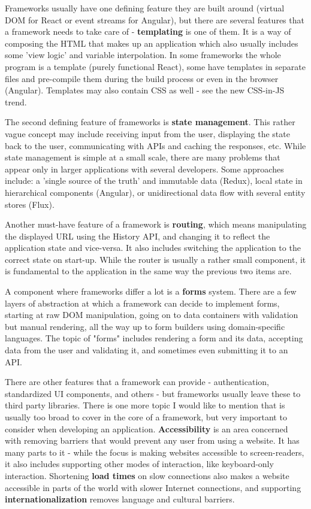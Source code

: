 \documentclass[english,odsaz]{fitthesis}
\begin{document}
Frameworks usually have one defining feature they are built around (virtual DOM
for React or event streams for Angular), but there are several features that a
framework needs to take care of - \textbf{templating} is one of them. It is a way of
composing the HTML that makes up an application which also usually includes some
'view logic' and variable interpolation. In some frameworks the whole program is
a template (purely functional React), some have templates in separate files and
pre-compile them during the build process or even in the browser
(Angular). Templates may also contain CSS as well - see the new CSS-in-JS trend.

The second defining feature of frameworks is \textbf{state management}. This rather vague
concept may include receiving input from the user, displaying the state back to
the user, communicating with APIs and caching the responses, etc. While state
management is simple at a small scale, there are many problems that appear only
in larger applications with several developers. Some approaches include: a
'single source of the truth' and immutable data (Redux), local state in
hierarchical components (Angular), or unidirectional data flow with several
entity stores (Flux).

Another must-have feature of a framework is \textbf{routing}, which means manipulating
the displayed URL using the History API, and changing it to reflect the
application state and vice-versa. It also includes switching the application to
the correct state on start-up. While the router is usually a rather small
component, it is fundamental to the application in the same way the previous two
items are.

A component where frameworks differ a lot is a \textbf{forms} system. There are a few
layers of abstraction at which a framework can decide to implement forms,
starting at raw DOM manipulation, going on to data containers with validation
but manual rendering, all the way up to form builders using domain-specific
languages. The topic of "forms" includes rendering a form and its data,
accepting data from the user and validating it, and sometimes even submitting it
to an API.

There are other features that a framework can provide - authentication,
standardized UI components, and others - but frameworks usually leave these to
third party libraries. There is one more topic I would like to mention that is
usually too broad to cover in the core of a framework, but very important to
consider when developing an application. \textbf{Accessibility} is an area concerned with
removing barriers that would prevent any user from using a website. It has many
parts to it - while the focus is making websites accessible to screen-readers,
it also includes supporting other modes of interaction, like keyboard-only
interaction. Shortening \textbf{load times} on slow connections also makes a website
accessible in parts of the world with slower Internet connections, and
supporting \textbf{internationalization} removes language and cultural barriers.
\end{document}
